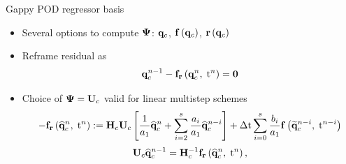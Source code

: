 \documentclass[]{beamer}
\begin{document}
\begin{frame}[noframenumbering]{Gappy POD regressor basis}
	\begin{itemize}
		\item Several options to compute $\deimBasis$: $\mathbf{q}_{c}$, $\mathbf{f} \left(\mathbf{q}_{c}\right)$, $\mathbf{r}\left(\mathbf{q}_{c}\right)$
		\item Reframe residual as
		\begin{equation*}
			\mathbf{q}_{c}^{n-1} - \mathbf{f}_{\mathbf{r}}\left(\mathbf{q}_{c}^{n},\; \text{t}^{n}\right) = \mathbf{0}
		\end{equation*}
		\item Choice of $\deimBasis = \consTrial$ valid for linear multistep schemes
		\begin{equation*}
			-\rhsResFunc{\consVecCoef^{\timeIdx},\; \timeVar^{\timeIdx}} \defEq \consScale \consTrial \left[\frac{1}{a_1} \consVecCoef^{\timeIdx} + \sum_{\dummyIdx=2}^{s} \frac{a_{\dummyIdx}}{a_1} \consVecCoef^{\timeIdx-\dummyIdx}\right] + \dt \sum_{\dummyIdx=0}^{s} \frac{b_{\dummyIdx}}{a_1} \rhsFunc{\consVecRom^{\timeIdx-\dummyIdx}, \; \timeVar^{\timeIdx-\dummyIdx}}
		\end{equation*}
		\begin{equation*}
			\consTrial \consVecCoef^{\timeIdx-1} = \consScaleInv \rhsResFunc{\consVecCoef^{\timeIdx},\; \timeVar^{\timeIdx}},
		\end{equation*}
	\end{itemize}
\end{frame}
\end{document}
